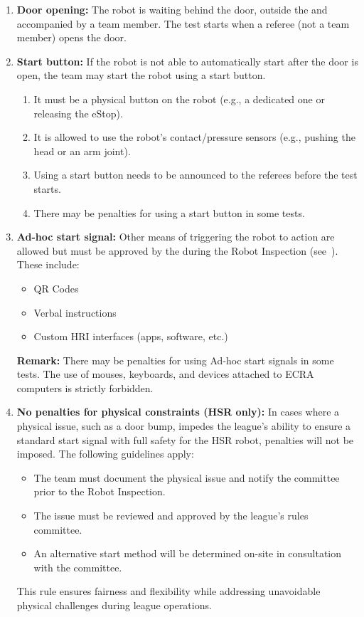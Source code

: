 \begin{enumerate}
    \item \textbf{Door opening:} The robot is waiting behind the door, outside the \Arena{} and accompanied by a team member.
    The test starts when a referee (not a team member) opens the door.

    \item \textbf{Start button:} If the robot is not able to automatically start after the door is open, the team may start the robot using a start button.
    \begin{enumerate}[nosep]
        \item It must be a physical button on the robot (e.g., a dedicated one or releasing the eStop).
        \item It is allowed to use the robot's contact/pressure sensors (e.g., pushing the head or an arm joint).
        \item Using a start button needs to be announced to the referees before the test starts.
        \item There may be penalties for using a start button in some tests.
    \end{enumerate}

    \item \textbf{Ad-hoc start signal:} Other means of triggering the robot to action are allowed but must be approved by the  during the Robot Inspection (see~).
    These include:
    \begin{itemize}[nosep]
        \item QR Codes
        \item Verbal instructions
        \item Custom HRI interfaces (apps, software, etc.)
    \end{itemize}
    \textbf{Remark:} There may be penalties for using Ad-hoc start signals in some tests. The use of mouses, keyboards, and devices attached to ECRA computers is strictly forbidden.

    \item \textbf{No penalties for physical constraints (HSR only):} 
    In cases where a physical issue, such as a door bump, impedes the league's ability to ensure a standard start signal with full safety for the HSR robot, penalties will not be imposed. The following guidelines apply:
    \begin{itemize}[nosep]
        \item The team must document the physical issue and notify the committee prior to the Robot Inspection.
        \item The issue must be reviewed and approved by the league's rules committee.
        \item An alternative start method will be determined on-site in consultation with the committee.
    \end{itemize}
    This rule ensures fairness and flexibility while addressing unavoidable physical challenges during league operations.
\end{enumerate}

